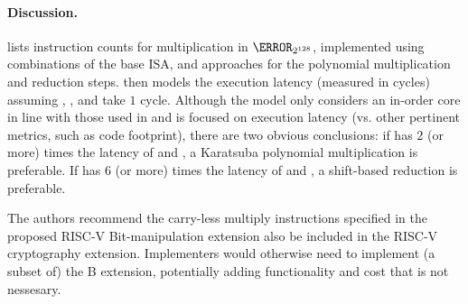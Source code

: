 \paragraph{Discussion.}

lists instruction counts for 
multiplication in $\F_{2^{128}}$,
implemented using combinations of the base ISA, and approaches
for the polynomial multiplication and reduction steps.
then models the execution latency 
(measured in cycles)
assuming , , and  take $1$ cycle.
Although the model only considers an in-order core in line with those used
in  and is focused on execution latency
(vs. other pertinent metrics, such as code footprint),
there are two obvious conclusions:
if
has $2$ (or more) times the latency of
 and ,
a 
Karatsuba
polynomial multiplication
is preferable.
If
has $6$ (or more) times the latency of
 and ,
a shift-based 
reduction 
is preferable.

The authors recommend the carry-less multiply instructions
specified in the proposed RISC-V Bit-manipulation extension also be included
in the RISC-V cryptography extension.
Implementers would otherwise need to implement (a subset of) the B
extension, potentially adding functionality and cost that is not
nessesary.

